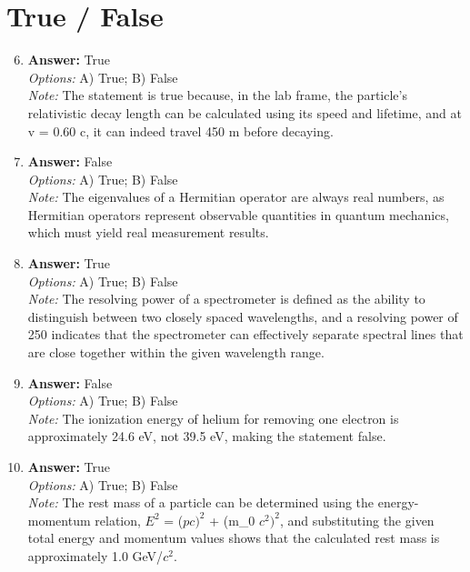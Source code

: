\documentclass[12pt]{article}
\begin{document}
\section*{True / False}
\begin{enumerate}[label=\arabic*.]
\setcounter{enumi}{5}
\item \textbf{Answer:} True
\\ \textit{Options:} A) True; B) False
\\ \textit{Note:} The statement is true because, in the lab frame, the particle's relativistic decay length can be calculated using its speed and lifetime, and at v = 0.60 c, it can indeed travel 450 m before decaying.
\item \textbf{Answer:} False
\\ \textit{Options:} A) True; B) False
\\ \textit{Note:} The eigenvalues of a Hermitian operator are always real numbers, as Hermitian operators represent observable quantities in quantum mechanics, which must yield real measurement results.
\item \textbf{Answer:} True
\\ \textit{Options:} A) True; B) False
\\ \textit{Note:} The resolving power of a spectrometer is defined as the ability to distinguish between two closely spaced wavelengths, and a resolving power of 250 indicates that the spectrometer can effectively separate spectral lines that are close together within the given wavelength range.
\item \textbf{Answer:} False
\\ \textit{Options:} A) True; B) False
\\ \textit{Note:} The ionization energy of helium for removing one electron is approximately 24.6 eV, not 39.5 eV, making the statement false.
\item \textbf{Answer:} True
\\ \textit{Options:} A) True; B) False
\\ \textit{Note:} The rest mass of a particle can be determined using the energy-momentum relation, $E^2$ = ($pc)^2$ + (m\_0 $c^2$$)^2$, and substituting the given total energy and momentum values shows that the calculated rest mass is approximately 1.0 GeV/$c^2$.
\end{enumerate}
\end{document}

